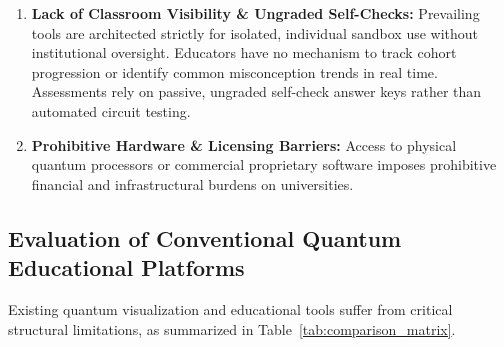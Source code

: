 \documentclass[11pt, a4paper]{article}
\begin{document}
\begin{enumerate}[label=\textbf{\arabic*.}]
	\item \textbf{Lack of Classroom Visibility \& Ungraded Self-Checks:} Prevailing tools are architected strictly for isolated, individual sandbox use without institutional oversight. Educators have no mechanism to track cohort progression or identify common misconception trends in real time. Assessments rely on passive, ungraded self-check answer keys rather than automated circuit testing.
	\item \textbf{Prohibitive Hardware \& Licensing Barriers:} Access to physical quantum processors or commercial proprietary software imposes prohibitive financial and infrastructural burdens on universities.
\end{enumerate}

\subsection{Evaluation of Conventional Quantum Educational Platforms}
Existing quantum visualization and educational tools suffer from critical structural limitations, as summarized in Table~\ref{tab:comparison_matrix}.
\end{document}
